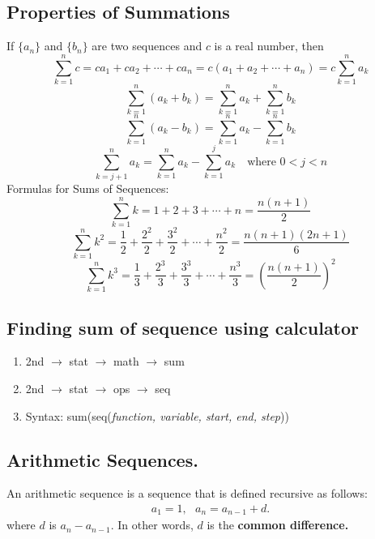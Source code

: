 \documentclass{report}
\begin{document}
    \subsection{Properties of Summations}
    If $\{a_n\}$ and $\{b_n\}$ are two sequences and $c$ is a real number, then
    \[
    \sum_{k=1}^{n} c = c a_1 + c a_2 + \cdots + c a_n = c(a_1 + a_2 + \cdots + a_n) = c \sum_{k=1}^{n} a_k
    \]
    \[
    \sum_{k=1}^{n} (a_k + b_k) = \sum_{k=1}^{n} a_k + \sum_{k=1}^{n} b_k
    \]
    \[
    \sum_{k=1}^{n} (a_k - b_k) = \sum_{k=1}^{n} a_k - \sum_{k=1}^{n} b_k
    \]
    \[
    \sum_{k=j+1}^{n} a_k = \sum_{k=1}^{n} a_k - \sum_{k=1}^{j} a_k \quad \text{where } 0 < j < n
    \]
    Formulas for Sums of Sequences:
    \[
    \sum_{k=1}^{n} k = 1 + 2 + 3 + \cdots + n = \frac{n(n + 1)}{2}
    \]
    \[
    \sum_{k=1}^{n} k^2 = \frac{1}{2} + \frac{2^2}{2} + \frac{3^2}{2} + \cdots + \frac{n^2}{2} = \frac{n(n + 1)(2n + 1)}{6}
    \]
    \[
    \sum_{k=1}^{n} k^3 = \frac{1}{3} + \frac{2^3}{3} + \frac{3^3}{3} + \cdots + \frac{n^3}{3} = \left(\frac{n(n + 1)}{2}\right)^2
    \]

    \bigbreak \noindent \bigbreak \noindent
    \subsection{Finding sum of sequence using calculator}
    \begin{enumerate}
      \item 2nd $\rightarrow$ stat $\rightarrow$ math $\rightarrow$ sum
      \item 2nd $\rightarrow$ stat $\rightarrow$ ops $\rightarrow$ seq
      \item Syntax: sum(seq(\textit{function, variable, start, end, step}))
   \end{enumerate}

   \pagebreak \bigbreak \noindent
   \subsection{
     Arithmetic Sequences.
   }

   \bigbreak \noindent 
   \smallbreak \noindent
   \begin{definition}
        \end{definition}
   An arithmetic sequence is a sequence that is defined recursive as follows:
   \begin{align*}
     a_{1} = 1, \ \ \ a_{n} = a_{n-1} + d
   .\end{align*}
   \bigbreak \noindent 
    where $d$ is $a_{n} - a_{n-1}$. In other words, $d$ is the \textbf{common difference.}
\end{document}
